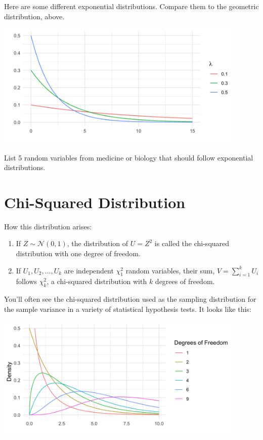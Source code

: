 Here are some different exponential distributions. Compare them to the geometric distribution, above.
\begin{center}
\includegraphics[width=0.9\textwidth]{img/l01-figure5-exponential-lambda-change.png}
\end{center}

\begin{question}{}
List 5 random variables from medicine or biology that should follow exponential distributions.
\end{question}


\section{Chi-Squared Distribution}

How this distribution arises:
\begin{enumerate}
\item If $Z \sim \mathcal{N}(0, 1)$, the distribution of $U = Z^2$ is called the chi-squared distribution with one degree of freedom.
\item If $U_1, U_2, \dots, U_k$ are independent $\chi_1^2$ random variables, their sum,
$ V = \sum_{i=1}^k U_i $
follows $\chi_k^2$, a chi-squared distribution with $k$ degrees of freedom.
\end{enumerate}

You'll often see the chi-squared distribution used as the sampling distribution for the sample variance in a variety of statistical hypothesis tests. It looks like this:
\begin{center}
\includegraphics[width=0.9\textwidth]{img/hyp-example-chisq-distribution.png}
\end{center}

